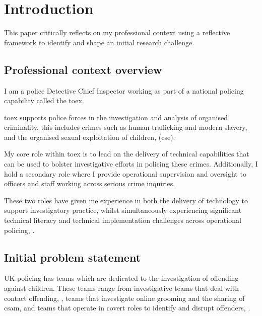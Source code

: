 \documentclass[12pt,a4paper,oneside]{report}
\begin{document}
\tableofcontents
\printglossary[type=\acronymtype]
\listoffigures

\clearpage

\chapter{Introduction}  
\label{ch:introduction}
This paper critically reflects on my professional context using a reflective framework to identify and shape an initial research challenge.

\section{Professional context overview}
\label{sec:professional-context-overview}
I am a police Detective Chief Inspector working as part of a national policing capability called the \gls{toex}.

\gls{toex} supports police forces in the investigation and analysis of organised criminality, this includes crimes such as human trafficking and modern slavery, and the organised sexual exploitation of children, (\gls{cse}).

My core role within \gls{toex} is to lead on the delivery of technical capabilities that can be used to bolster investigative efforts in policing these crimes.  Additionally, I hold a secondary role where I provide operational supervision and oversight to officers and staff working across serious crime inquiries.

These two roles have given me experience in both the delivery of technology to support investigatory practice, whilst simultaneously experiencing significant technical literacy and technical implementation challenges across operational policing, \citep{thompson2021missed}.

\section{Initial problem statement}
\label{sec:initial-problem-statement}
UK policing has teams which are dedicated to the investigation of offending against children.  These teams range from investigative teams that deal with contact offending, \citep{collegeo2022caiu}, teams that investigate online grooming and the sharing of \gls{csam}, \citep{hmicfrs2024polit} and teams that operate in covert roles to identify and disrupt offenders, \citep{npcc2024ucol}.
\end{document}
